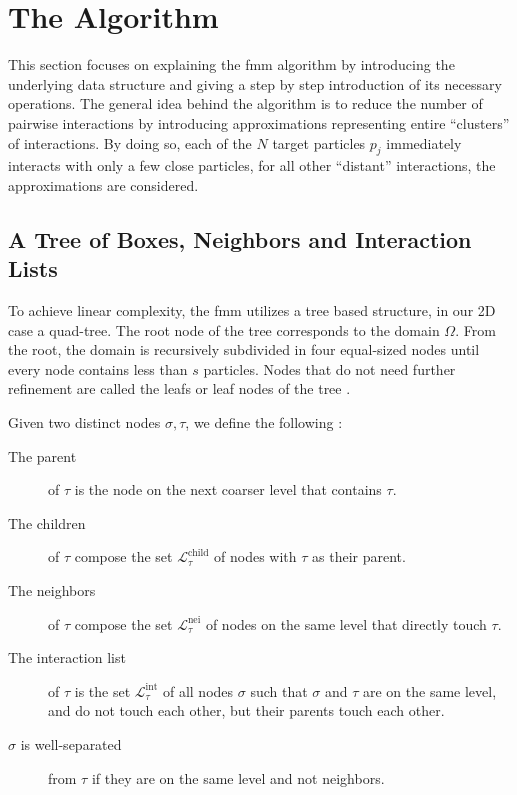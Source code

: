 \section{The Algorithm}
\label{algorithm}

\newcommand\scaleFigures{0.8} %

This section focuses on explaining the \gls{fmm} algorithm by introducing the underlying data structure and giving a step by step introduction of its necessary operations.
The general idea behind the algorithm is to reduce the number of pairwise interactions by introducing approximations representing entire ``clusters'' of interactions.
By doing so, each of the $N$ target particles $p_j$ immediately interacts with only a few close particles, for all other ``distant'' interactions, the approximations are considered.

\subsection{A Tree of Boxes, Neighbors and Interaction Lists}

To achieve linear complexity, the \gls{fmm} utilizes a tree based structure, in our 2D case a quad-tree.
The root node of the tree corresponds to the domain $\Omega$.
From the root, the domain is recursively subdivided in four equal-sized nodes until every node contains less than $s$ particles.
Nodes that do not need further refinement are called the leafs or leaf nodes of the tree \cite{Martinsson2015}.

Given two distinct nodes $\sigma,\tau$, we define the following \cite{Martinsson2015}:
\begin{description}
  \item[The parent] of $\tau$ is the node on the next coarser level that contains $\tau$.
  \item[The children] of $\tau$ compose the set $\mathcal{L}_{\tau}^\text{child}$ of nodes with $\tau$ as their parent.
  \item[The neighbors] of $\tau$ compose the set $\mathcal{L}_{\tau}^\text{nei}$ of nodes on the same level that directly touch $\tau$.
  \item[The interaction list] of $\tau$ is the set $\mathcal{L}_{\tau}^\text{int}$ of all nodes $\sigma$ such that $\sigma$ and $\tau$ are on the same level, and do not touch each other, but their parents touch each other.
  \item[$\sigma$ is well-separated] from $\tau$ if they are on the same level and not neighbors.
\end{description}

